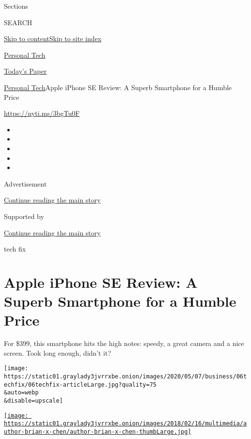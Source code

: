Sections

SEARCH

\protect\hyperlink{site-content}{Skip to
content}\protect\hyperlink{site-index}{Skip to site index}

\href{https://www.nytimes3xbfgragh.onion/section/technology/personaltech}{Personal
Tech}

\href{https://myaccount.nytimes3xbfgragh.onion/auth/login?response_type=cookie\&client_id=vi}{}

\href{https://www.nytimes3xbfgragh.onion/section/todayspaper}{Today's
Paper}

\href{/section/technology/personaltech}{Personal Tech}\textbar{}Apple
iPhone SE Review: A Superb Smartphone for a Humble Price

\url{https://nyti.ms/3bgTu0F}

\begin{itemize}
\item
\item
\item
\item
\item
\end{itemize}

Advertisement

\protect\hyperlink{after-top}{Continue reading the main story}

Supported by

\protect\hyperlink{after-sponsor}{Continue reading the main story}

tech fix

\hypertarget{apple-iphone-se-review-a-superb-smartphone-for-a-humble-price}{%
\section{Apple iPhone SE Review: A Superb Smartphone for a Humble
Price}\label{apple-iphone-se-review-a-superb-smartphone-for-a-humble-price}}

For \$399, this smartphone hits the high notes: speedy, a great camera
and a nice screen. Took long enough, didn't it?

\texttt{[image: https://static01.graylady3jvrrxbe.onion/images/2020/05/07/business/06techfix/06techfix-articleLarge.jpg?quality=75\\\&auto=webp\\\&disable=upscale]}

\href{https://www.nytimes3xbfgragh.onion/by/brian-x-chen}{\texttt{[image: https://static01.graylady3jvrrxbe.onion/images/2018/02/16/multimedia/author-brian-x-chen/author-brian-x-chen-thumbLarge.jpg]}}

